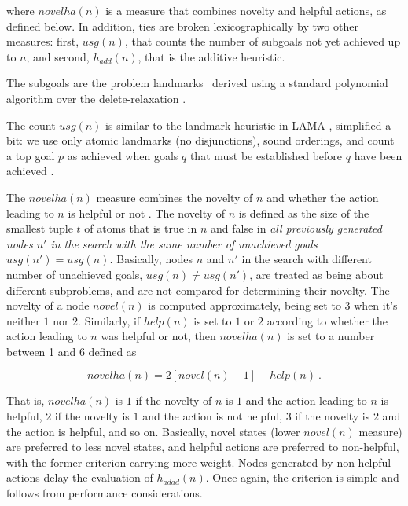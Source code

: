 \documentclass[letterpaper]{article}
\begin{document}
\noindent where $novelha(n)$ is a measure that combines novelty and
helpful actions, as defined below.  In addition, ties are broken
lexicographically by two other measures: first, $usg(n)$, that counts
the number of subgoals not yet achieved up to $n$, and second,
$h_{add}(n)$, that is the additive heuristic.


The subgoals are the problem landmarks \cite{hoffmann:landmarks}\  derived using a
standard polynomial  algorithm over the delete-relaxation \cite{givan:landmarks,keyder:ecai10}.

The count $usg(n)$ is similar to the landmark heuristic in LAMA \cite{richter:lama},
simplified  a bit:  we use only atomic landmarks (no disjunctions), sound orderings, 
and count a top goal $p$ as achieved when goals $q$ that must be established before
$q$ have been achieved \cite{nir:icaps11}.



The $novelha(n)$ measure combines the novelty of $n$ and whether the action leading to $n$
is helpful or not \cite{hoffmann:ff}. The novelty of $n$ is
defined as the size of the smallest tuple $t$ of atoms that is true in  $n$ and
false in  \emph{all previously generated nodes $n'$ in the search
with the  same number of unachieved goals $usg(n') = usg(n)$.}
Basically, nodes $n$ and $n'$ in the search with different number of unachieved goals,
$usg(n) \not= usg(n')$, are treated as being about different subproblems,
and are not compared for determining their novelty.
The novelty of a node $novel(n)$ is computed approximately, being set to $3$
when it's neither $1$ nor $2$. Similarly, if $help(n)$ is set  to $1$ or $2$
according to whether the action leading to $n$ was helpful or not,
then $novelha(n)$ is set to  a  number between 1 and 6 defined as

\begin{equation}
novelha(n) = 2 [novel(n)-1] + help(n) \ .
\label{novelha}
\end{equation}

\noindent That is, $novelha(n)$ is $1$ if the novelty of $n$ is $1$
and the action leading to $n$ is helpful, $2$ if the novelty is $1$
and the action is not helpful, $3$ if the novelty is $2$ and the
action is helpful, and so on. Basically, novel states (lower
$novel(n)$ measure) are preferred to less novel states, and helpful
actions are preferred to non-helpful, with the former criterion
carrying more weight. Nodes generated by non-helpful actions delay the
evaluation of $h_{adad}(n)$. Once again, the criterion is simple and
follows from performance considerations.
\end{document}
